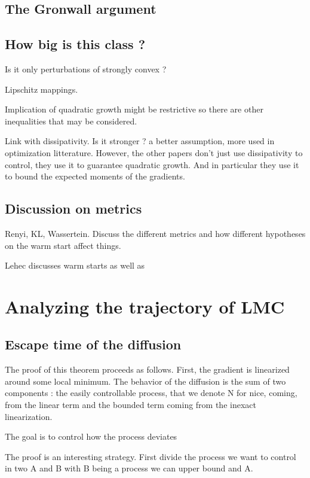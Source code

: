 \documentclass[11pt,twoside]{article}
\begin{document}
\subsection{The Gronwall argument}

\subsection{How big is this class ?}

Is it only perturbations of strongly convex ?

Lipschitz mappings.

Implication of  quadratic growth might be restrictive so there are other inequalities that may be considered. 

Link with dissipativity. Is it stronger ? a better assumption, more used in optimization litterature. However, the other papers don't just use dissipativity to control, they use it to guarantee quadratic growth. And in particular they use it to bound the expected moments of the gradients.

\subsection{Discussion on metrics}

Renyi, KL, Wassertein.
Discuss the different metrics and how different hypotheses on the warm start affect things.

Lehec discusses warm starts as well as 

\section{Analyzing the trajectory of LMC}



\subsection{Escape time of the diffusion}

The proof of this theorem proceeds as follows. First, the gradient is linearized around some local minimum. The behavior of the diffusion is the sum of two components : the easily controllable process, that we denote N for nice, coming, from the linear term and the bounded term coming from the inexact linearization. 

The goal is to control how the process deviates

The proof is an interesting strategy. First divide the process we want to control in two A and B with B being a process we can upper bound and A.
\end{document}

